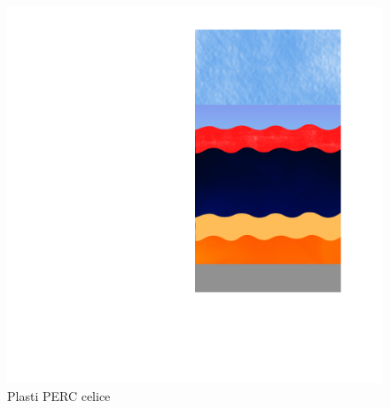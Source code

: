 \documentclass[a4paper,twoside,openright,12pt,slovene]{book}
\begin{document}
\begin{minipage}{.5\linewidth}
\vspace{-20pt}
\begin{figure}[H]
    \centering
    \includegraphics[trim={170 90 40 20}, clip, height=2.2\linewidth,  width=.6\linewidth]{Slike/PERC_struktura.png}
    \caption{Plasti PERC celice}
    \label{fig:my_label}
\end{figure}
\end{minipage}
\vspace{5pt}
\end{document}
